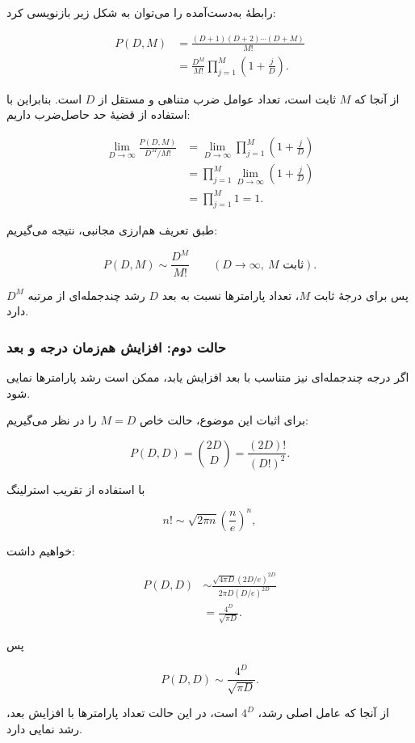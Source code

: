 \documentclass[12pt,a4paper]{article}
\begin{document}
رابطۀ به‌دست‌آمده را می‌توان به شکل زیر بازنویسی کرد:

\[
\begin{aligned}
P(D,M)
&=\frac{(D+1)(D+2)\cdots(D+M)}{M!}\\[4pt]
&=\frac{D^M}{M!}
\prod_{j=1}^{M}\left(1+\frac{j}{D}\right).
\end{aligned}
\]

از آنجا که $M$ ثابت است، تعداد عوامل ضرب
متناهی و مستقل از $D$ است.
بنابراین با استفاده از قضیۀ حد حاصل‌ضرب داریم:

\[
\begin{aligned}
\lim_{D\to\infty}
\frac{P(D,M)}{D^M/M!}
&=
\lim_{D\to\infty}
\prod_{j=1}^{M}\left(1+\frac{j}{D}\right)\\[6pt]
&=
\prod_{j=1}^{M}
\lim_{D\to\infty}\left(1+\frac{j}{D}\right)\\[6pt]
&=
\prod_{j=1}^{M}1=1.
\end{aligned}
\]

طبق تعریف هم‌ارزی مجانبی، نتیجه می‌گیریم:

\[
\boxed{
P(D,M)\sim\frac{D^M}{M!}
\qquad (D\to\infty,\ M\text{ ثابت}).
}
\]

پس برای درجۀ ثابت $M$، تعداد پارامترها
نسبت به بعد $D$ رشد چندجمله‌ای از مرتبه
$D^M$ دارد.


\subsubsection{حالت دوم: افزایش هم‌زمان درجه و بعد}

اگر درجه چندجمله‌ای نیز متناسب با بعد
افزایش یابد، ممکن است رشد پارامترها
نمایی شود.

برای اثبات این موضوع، حالت خاص
$M=D$ را در نظر می‌گیریم:

\[
P(D,D)=\binom{2D}{D}
=\frac{(2D)!}{(D!)^2}.
\]

با استفاده از تقریب استرلینگ

\[
n!\sim\sqrt{2\pi n}
\left(\frac{n}{e}\right)^n,
\]

خواهیم داشت:

\[
\begin{aligned}
P(D,D)
&\sim
\frac{
\sqrt{4\pi D}(2D/e)^{2D}
}{
2\pi D(D/e)^{2D}
}\\[4pt]
&=
\frac{4^D}{\sqrt{\pi D}}.
\end{aligned}
\]

پس

\[
\boxed{
P(D,D)\sim\frac{4^D}{\sqrt{\pi D}}.
}
\]

از آنجا که عامل اصلی رشد، $4^D$ است،
در این حالت تعداد پارامترها با افزایش
بعد، رشد نمایی دارد.
\end{document}
